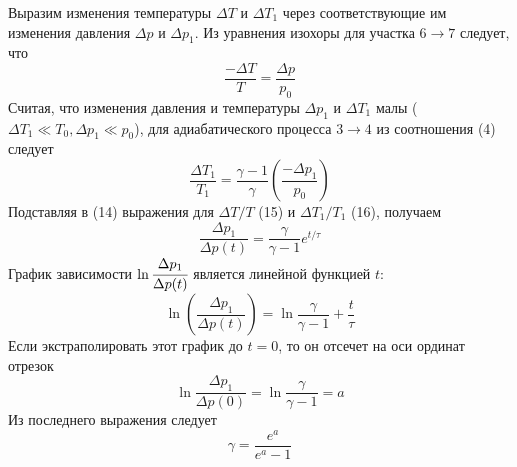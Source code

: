 \documentclass[a4paper,12pt]{article}
\theoremstyle{plain} %
\theoremstyle{definition} %
\theoremstyle{remark} %
\begin{document}
Выразим изменения температуры $\Delta T$ и $\Delta T_1$ через соответствующие им изменения давления $\Delta p$ и $\Delta p_1$. Из уравнения изохоры для участка $6\rightarrow7$ следует, что 
\begin{equation}
\frac{-\Delta T}{T} = \frac{\Delta p}{p_0}
\end{equation}
Считая, что изменения давления и температуры $\Delta p_1$ и $\Delta T_1$ малы ($\Delta T_1 \ll T_0, \Delta p_1 \ll p_0$), для адиабатического процесса $3\rightarrow4$ из соотношения (4) следует 
\begin{equation}
\frac{\Delta T_1}{T_1} = \frac{\gamma - 1}{\gamma}\left(\frac{-\Delta p_1}{p_0}\right)
\end{equation}
Подставляя в (14) выражения для $\Delta T/T$ (15) и $\Delta T_1/T_1$ (16), получаем
\begin{equation}
\frac{\Delta p_1}{\Delta p(t)} = \frac{\gamma}{\gamma -1}e^{t/\tau}
\end{equation}
График зависимости $\ln \cfrac{\Delta p_1}{\Delta p(t)}$ является линейной функцией $t$:
\begin{equation}
\ln\left(\frac{\Delta p_1}{\Delta p(t)}\right) = \ln \frac{\gamma}{\gamma - 1} + \frac{t}{\tau}
\end{equation}
Если экстраполировать этот график до $t = 0$, то он отсечет на оси ординат отрезок 
\[ \ln \frac{\Delta p_1}{\Delta p(0)} = \ln\frac{\gamma}{\gamma - 1} = a\]
Из последнего выражения следует
\begin{equation}
\gamma = \frac{e^a}{e^a-1}
\end{equation}
\end{document}
